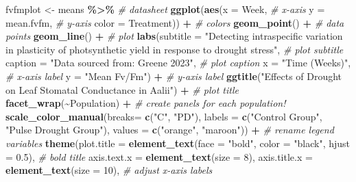 \documentclass[
]{article}
\newenvironment{Shaded}{\begin{snugshade}}{\end{snugshade}}
\newcommand{\AttributeTok}[1]{\textcolor[rgb]{0.13,0.29,0.53}{#1}}
\newcommand{\CommentTok}[1]{\textcolor[rgb]{0.56,0.35,0.01}{\textit{#1}}}
\newcommand{\DecValTok}[1]{\textcolor[rgb]{0.00,0.00,0.81}{#1}}
\newcommand{\FloatTok}[1]{\textcolor[rgb]{0.00,0.00,0.81}{#1}}
\newcommand{\FunctionTok}[1]{\textcolor[rgb]{0.13,0.29,0.53}{\textbf{#1}}}
\newcommand{\NormalTok}[1]{#1}
\newcommand{\OtherTok}[1]{\textcolor[rgb]{0.56,0.35,0.01}{#1}}
\newcommand{\SpecialCharTok}[1]{\textcolor[rgb]{0.81,0.36,0.00}{\textbf{#1}}}
\newcommand{\StringTok}[1]{\textcolor[rgb]{0.31,0.60,0.02}{#1}}
\begin{document}
\begin{Shaded}
\begin{Highlighting}[]
\NormalTok{fvfmplot }\OtherTok{\textless{}{-}}\NormalTok{ means }\SpecialCharTok{\%\textgreater{}\%} \CommentTok{\# datasheet}
  \FunctionTok{ggplot}\NormalTok{(}\FunctionTok{aes}\NormalTok{(}\AttributeTok{x =}\NormalTok{ Week, }\CommentTok{\# x{-}axis}
             \AttributeTok{y =}\NormalTok{ mean.fvfm, }\CommentTok{\# y{-}axis}
             \AttributeTok{color =}\NormalTok{ Treatment)) }\SpecialCharTok{+} \CommentTok{\# colors}
  \FunctionTok{geom\_point}\NormalTok{() }\SpecialCharTok{+}  \CommentTok{\# data points}
  \FunctionTok{geom\_line}\NormalTok{() }\SpecialCharTok{+}  \CommentTok{\# plot}
  \FunctionTok{labs}\NormalTok{(}\AttributeTok{subtitle =} \StringTok{"Detecting intraspecific variation in plasticity of photsynthetic yield in response to drought stress"}\NormalTok{, }\CommentTok{\# plot subtitle}
       \AttributeTok{caption =} \StringTok{"Data sourced from: Greene 2023"}\NormalTok{, }\CommentTok{\# plot caption}
       \AttributeTok{x =} \StringTok{"Time (Weeks)"}\NormalTok{, }\CommentTok{\# x{-}axis label}
       \AttributeTok{y =} \StringTok{"Mean Fv/Fm"}\NormalTok{) }\SpecialCharTok{+} \CommentTok{\# y{-}axis label}
  \FunctionTok{ggtitle}\NormalTok{(}\StringTok{"Effects of Drought on Leaf Stomatal Conductance in \textquotesingle{}A\textquotesingle{}ali\textquotesingle{}i"}\NormalTok{) }\SpecialCharTok{+} \CommentTok{\# plot title}
  \FunctionTok{facet\_wrap}\NormalTok{(}\SpecialCharTok{\textasciitilde{}}\NormalTok{Population) }\SpecialCharTok{+} \CommentTok{\# create panels for each population!}
  \FunctionTok{scale\_color\_manual}\NormalTok{(}\AttributeTok{breaks=} \FunctionTok{c}\NormalTok{(}\StringTok{"C"}\NormalTok{, }\StringTok{"PD"}\NormalTok{), }\AttributeTok{labels =} \FunctionTok{c}\NormalTok{(}\StringTok{"Control Group"}\NormalTok{, }\StringTok{"Pulse Drought Group"}\NormalTok{), }\AttributeTok{values =} \FunctionTok{c}\NormalTok{(}\StringTok{"orange"}\NormalTok{, }\StringTok{"maroon"}\NormalTok{)) }\SpecialCharTok{+} \CommentTok{\# rename legend variables}
  \FunctionTok{theme}\NormalTok{(}\AttributeTok{plot.title =} \FunctionTok{element\_text}\NormalTok{(}\AttributeTok{face =} \StringTok{"bold"}\NormalTok{, }\AttributeTok{color =} \StringTok{"black"}\NormalTok{, }\AttributeTok{hjust =} \FloatTok{0.5}\NormalTok{), }\CommentTok{\# bold title}
        \AttributeTok{axis.text.x =} \FunctionTok{element\_text}\NormalTok{(}\AttributeTok{size =} \DecValTok{8}\NormalTok{), }\AttributeTok{axis.title.x =} \FunctionTok{element\_text}\NormalTok{(}\AttributeTok{size =} \DecValTok{10}\NormalTok{), }\CommentTok{\# adjust x{-}axis labels}

\end{Highlighting}
\end{Shaded}
\end{document}
